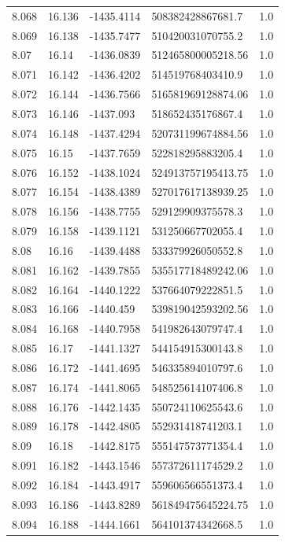 \begin{tabular}{lllll}
8.068 & 16.136 & -1435.4114 & 508382428867681.7 & 1.0 \\
8.069 & 16.138 & -1435.7477 & 510420031070755.2 & 1.0 \\
8.07 & 16.14 & -1436.0839 & 512465800005218.56 & 1.0 \\
8.071 & 16.142 & -1436.4202 & 514519768403410.9 & 1.0 \\
8.072 & 16.144 & -1436.7566 & 516581969128874.06 & 1.0 \\
8.073 & 16.146 & -1437.093 & 518652435176867.4 & 1.0 \\
8.074 & 16.148 & -1437.4294 & 520731199674884.56 & 1.0 \\
8.075 & 16.15 & -1437.7659 & 522818295883205.4 & 1.0 \\
8.076 & 16.152 & -1438.1024 & 524913757195413.75 & 1.0 \\
8.077 & 16.154 & -1438.4389 & 527017617138939.25 & 1.0 \\
8.078 & 16.156 & -1438.7755 & 529129909375578.3 & 1.0 \\
8.079 & 16.158 & -1439.1121 & 531250667702055.4 & 1.0 \\
8.08 & 16.16 & -1439.4488 & 533379926050552.8 & 1.0 \\
8.081 & 16.162 & -1439.7855 & 535517718489242.06 & 1.0 \\
8.082 & 16.164 & -1440.1222 & 537664079222851.5 & 1.0 \\
8.083 & 16.166 & -1440.459 & 539819042593202.56 & 1.0 \\
8.084 & 16.168 & -1440.7958 & 541982643079747.4 & 1.0 \\
8.085 & 16.17 & -1441.1327 & 544154915300143.8 & 1.0 \\
8.086 & 16.172 & -1441.4695 & 546335894010797.6 & 1.0 \\
8.087 & 16.174 & -1441.8065 & 548525614107406.8 & 1.0 \\
8.088 & 16.176 & -1442.1435 & 550724110625543.6 & 1.0 \\
8.089 & 16.178 & -1442.4805 & 552931418741203.1 & 1.0 \\
8.09 & 16.18 & -1442.8175 & 555147573771354.4 & 1.0 \\
8.091 & 16.182 & -1443.1546 & 557372611174529.2 & 1.0 \\
8.092 & 16.184 & -1443.4917 & 559606566551373.4 & 1.0 \\
8.093 & 16.186 & -1443.8289 & 561849475645224.75 & 1.0 \\
8.094 & 16.188 & -1444.1661 & 564101374342668.5 & 1.0 \\

\end{tabular}
